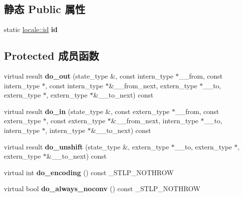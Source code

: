 \subsection*{静态 Public 属性}
\begin{DoxyCompactItemize}
\item 
\mbox{\label{classcodecvt_a26366693ec535354eb5f4c28fc4142fb}} 
static \hyperlink{classlocale_1_1id}{locale\+::id} {\bfseries id}
\end{DoxyCompactItemize}
\subsection*{Protected 成员函数}
\begin{DoxyCompactItemize}
\item 
\mbox{\label{classcodecvt_adf8d1de0ec5a070f761b4b88a35ef66d}} 
virtual result {\bfseries do\+\_\+out} (state\+\_\+type \&, const intern\+\_\+type $\ast$\+\_\+\+\_\+from, const intern\+\_\+type $\ast$, const intern\+\_\+type $\ast$\&\+\_\+\+\_\+from\+\_\+next, extern\+\_\+type $\ast$\+\_\+\+\_\+to, extern\+\_\+type $\ast$, extern\+\_\+type $\ast$\&\+\_\+\+\_\+to\+\_\+next) const
\item 
\mbox{\label{classcodecvt_ad19e45cee971b3916ae80b26333cdc5d}} 
virtual result {\bfseries do\+\_\+in} (state\+\_\+type \&, const extern\+\_\+type $\ast$\+\_\+\+\_\+from, const extern\+\_\+type $\ast$, const extern\+\_\+type $\ast$\&\+\_\+\+\_\+from\+\_\+next, intern\+\_\+type $\ast$\+\_\+\+\_\+to, intern\+\_\+type $\ast$, intern\+\_\+type $\ast$\&\+\_\+\+\_\+to\+\_\+next) const
\item 
\mbox{\label{classcodecvt_a2081210e464decbe8bd256031af4cbbf}} 
virtual result {\bfseries do\+\_\+unshift} (state\+\_\+type \&, extern\+\_\+type $\ast$\+\_\+\+\_\+to, extern\+\_\+type $\ast$, extern\+\_\+type $\ast$\&\+\_\+\+\_\+to\+\_\+next) const
\item 
\mbox{\label{classcodecvt_a7c49c767330993045efda27a645ca08e}} 
virtual int {\bfseries do\+\_\+encoding} () const \+\_\+\+S\+T\+L\+P\+\_\+\+N\+O\+T\+H\+R\+OW
\item 
\mbox{\label{classcodecvt_a18294bd525c5bfeff8e28661b137b3ce}} 
virtual bool {\bfseries do\+\_\+always\+\_\+noconv} () const \+\_\+\+S\+T\+L\+P\+\_\+\+N\+O\+T\+H\+R\+OW

\end{DoxyCompactItemize}
